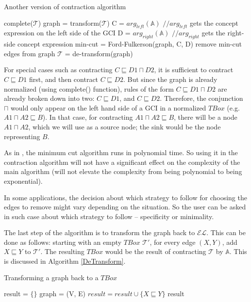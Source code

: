 \begin{algorithm}
\caption{Another version of contraction algorithm}
\label{GraphContract-modified}
\begin{algorithmic}[1]
\State complete($ \mathcal{T} $)
\State graph = transform($ \mathcal{T} $)
\State C = $arg_{left}(\mathbb{A})$ $//arg_{left}$ gets the concept expression on the left side of the GCI
\State D = $arg_{right}(\mathbb{A})$ $//arg_{right}$ gets the right-side concept expression
\State min-cut = Ford-Fulkerson(graph, C, D)
\State remove min-cut edges from graph
\State $ \mathcal{T} $ = de-transform(graph)
\EndFunction
\end{algorithmic}
\end{algorithm}

For special cases such as contracting $C \sqsubseteq D1 \sqcap D2$, it is sufficient to contract $C \sqsubseteq D1$ first, and then contract $C \sqsubseteq D2$. But since the graph is already normalized (using complete() function), rules of the form $C \sqsubseteq D1 \sqcap D2$ are already broken down into two: $C \sqsubseteq D1$, and $C \sqsubseteq D2$. Therefore, the conjunction $\sqcap$ would only appear on the left hand side of a GCI in a normalized $TBox$ (e.g. $A1 \sqcap A2 \sqsubseteq B$). In that case, for contracting $A1 \sqcap A2 \sqsubseteq B$, there will be a node $A1 \sqcap A2$, which we will use as a source node; the sink would be the node representing $B$. 

As in \cite{alg}, the minimum cut algorithm runs in polynomial time. So using it in the contraction algorithm will not have a significant effect on the complexity of the main algorithm (will not elevate the complexity from being polynomial to being exponential). 

In some applications, the decision about which strategy to follow for choosing the edges to remove might vary depending on the situation. So the user can be asked in such case about which strategy to follow -- specificity or minimality. 

The last step of the algorithm is to transform the graph back to $\mathcal{EL}$. This can be done as follows: starting with an empty $TBox$ $\mathcal{T'}$, for every edge $(X, Y)$, add $X \sqsubseteq Y$ to $\mathcal{T'}$. The resulting $TBox$ would be the result of contracting $\mathcal{T}$ by $\mathbb{A}$. This is discussed in Algorithm \ref{DeTransform}.

\begin{algorithm}
\caption{Transforming a graph back to a $TBox$}
\label{DeTransform}
\begin{algorithmic}[1]
\State result = $\{\}$
\State graph = (V, E)
\State $result = result \cup \{X \sqsubseteq Y\}$
\EndFor
\State \Return result
\EndFunction
\end{algorithmic}
\end{algorithm}

